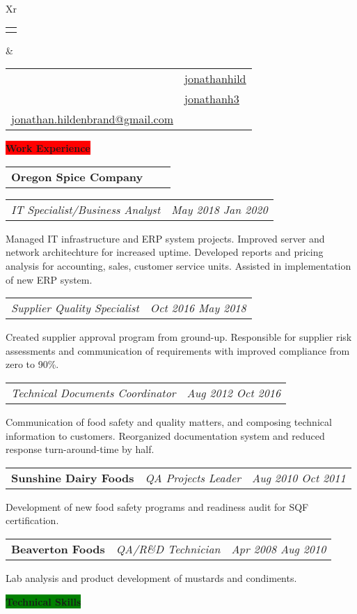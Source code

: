 \documentclass[letterpaper,12pt]{article}[leftmargin=*]
\makeatletter
\def\fullname{Jonathan Hildenbrand}
\def\githubicon{\faGithub}
\def\githublink{https://github.com/jonathanhild}
\def\githubtext{jonathanhild}
\def\linkedinicon{\faLinkedin}
\def\linkedinlink{https://linkedin.com/in/jonathanh3}
\def\linkedintext{jonathanh3}
\def\phoneicon{\faPhone}
\def\phonetext{+1-971-409-0695}
\def\emailicon{\faEnvelope}
\def\emaillink{mailto:jonathan.hildenbrand+resume@gmail.com}
\def\emailtext{jonathan.hildenbrand@gmail.com}
\def\locationicon{\faMapMarker}
\def\locationtext{Portland, Oregon}
\def\targeticon{\faBinoculars}
\def\targettext{Local \& Remote}
\def\headertype{\doublecol} %
\def\location{\hspace{3pt}\locationicon \hspace{5pt}{\color{links}\locationtext}}
\def\target{\targeticon\hspace{3pt}{\color{links}\targettext}}
\def\phone{\phoneicon\hspace{3pt}{\color{links}{\phonetext}}}
\def\linkedin{\linkedinicon\hspace{3pt}\href{\linkedinlink}{\underline{\linkedintext}}}
\def\email{\emailicon\hspace{3pt}\href{\emaillink}{\underline{\emailtext}}}
\def\github{\githubicon\hspace{3pt}\href{\githublink}{\underline{\githubtext}}}
\newcommand{\skills}[2]{\vspace{4pt}
  \colorbox{Green}{\color{white}#1\hspace{9pt}\raggedbottom\normalsize\textbf{#2\hspace{4pt}}}
}
\newcommand{\experience}[2]{\vspace{4pt}
  \colorbox{Red}{\color{white}#1\hspace{9pt}\raggedbottom\normalsize\textbf{#2\hspace{4pt}}}
}
\newcommand{\resumeSectionStart}{\begin{itemize}[leftmargin=0.1in]}
\newcommand{\resumeSectionEnd}{\end{itemize}}
\newcommand{\resumeExperience}[3]{
  \item[]
    \begin{tabularx}{0.97\textwidth}{>{\raggedright}X >{\raggedright\arraybackslash}X >{\raggedleft\arraybackslash}X}
      \textbf{\color{primary}#1} & \textit{\color{accent}#2} & \textit{\color{accent}\small#3} \\
  \end{tabularx}
   \vspace{-6pt}
   
}
\newcommand{\resumeSubExperience}[2]{
  \begin{tabularx}{0.97\textwidth}{>{\raggedright\arraybackslash}X >{\raggedleft}X}
    \textit{\color{accent}#1} & \textit{\color{accent}\small#2}
  \end{tabularx}
}
\newcommand{\doublecol}[6]{
  \begin{tabularx}{\textwidth}{Xr}
    {
      \begin{tabular}[c]{l}
        \fontsize{24}{34}\selectfont{\color{primary}{{\textbf{\fullname}}}}
      \end{tabular}
    } & {
      \begin{tabular}[c]{l@{\hspace{1.5em}} l}
        {\small#4} & {\small#1} \\
        {\small#5} & {\small#2} \\
        {\small#6} & {\small#3}
      \end{tabular}
    }
  \end{tabularx}
}
\newcommand{\singlecol}[6]{
  \begin{tabularx}{\textwidth}{Xr}
    {
      \begin{tabular}[b]{l}
        \fontsize{35}{45}\selectfont{\color{primary}{{\textbf{\fullname}}}} \\
        {\textit{\subtitle}} %
      \end{tabular}
    } & {
      \begin{tabular}[c]{l}
        {\small#1} \\
        {\small#2} \\
        {\small#3} \\
        {\small#4} \\
        {\small#5} \\
        {\small#6}
      \end{tabular}
    }
  \end{tabularx}
}
\makeatother
\begin{document}
\headertype{\github}{\linkedin}{\phone}{\location}{\target}{\email} %

\experience{\faPieChart}{Work Experience}

\resumeSectionStart{
  \resumeExperience{Oregon Spice Company}{}{}
  \resumeSubExperience{IT Specialist/Business Analyst}{May 2018 \textemdash{} Jan 2020}Managed IT infrastructure and ERP system projects. Improved server and network architechture for increased uptime. Developed reports and pricing analysis for accounting, sales, customer service units. Assisted in implementation of new ERP system.
  \resumeSubExperience{Supplier Quality Specialist}{Oct 2016 \textemdash{} May 2018}Created supplier approval program from ground-up. Responsible for supplier risk assessments and communication of requirements with improved compliance from zero to 90\%.
  \resumeSubExperience{Technical Documents Coordinator}{Aug 2012 \textemdash Oct 2016}Communication of food safety and quality matters, and composing technical information to customers. Reorganized documentation system and reduced response turn-around-time by half.}\vspace{-6pt}\resumeSectionEnd{}
\resumeSectionStart{\resumeExperience{Sunshine Dairy Foods}{QA Projects Leader}{Aug 2010 \textemdash{} Oct 2011}Development of new food safety programs and readiness audit for SQF certification.}\vspace{-6pt}\resumeSectionEnd{}
\resumeSectionStart{\resumeExperience{Beaverton Foods}{QA/R\&D Technician}{Apr 2008 \textemdash{} Aug 2010}Lab analysis and product development of mustards and condiments.}\vspace{-6pt}\resumeSectionEnd{}


\skills{\faGears}{Technical Skills}
\end{document}
